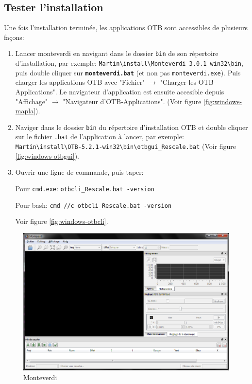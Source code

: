 \documentclass[10pt,a4paper]{article}
\begin{document}
\subsection{Tester l'installation}
Une fois l'installation terminée, les applications OTB sont accessibles de
plusieurs façons:
\begin{enumerate}

  \item Lancer monteverdi en navigant dans le dossier \texttt{bin} de son répertoire
d'installation, par exemple:
\texttt{Martin{\textbackslash}install{\textbackslash}Monteverdi-3.0.1-win32{\textbackslash}bin},
puis double cliquer sur \textbf{\texttt{monteverdi.bat}} (et non pas
\texttt{monteverdi.exe}).
Puis charger les applications OTB avec "Fichier" $\rightarrow$ "Charger les
OTB-Applications".
Le navigateur d'application est ensuite accesible depuis "Affichage"
$\rightarrow$ "Navigateur d'OTB-Applications".
(Voir figure \ref{fig:windows-mapla}).

  \item Naviger dans le dossier \texttt{bin} du répertoire d'installation OTB et double cliquer sur le
  fichier \texttt{.bat} de l'application à lancer, par exemple:\\
  \texttt{Martin{\textbackslash}install{\textbackslash}OTB-5.2.1-win32{\textbackslash}bin{\textbackslash}otbgui\_Rescale.bat}
  (Voir figure \ref{fig:windows-otbgui}).

  \item Ouvrir une ligne de commande, puis taper:

    Pour \texttt{cmd.exe}: \texttt{otbcli\_Rescale.bat -version}

    Pour bash: \texttt{cmd //c otbcli\_Rescale.bat -version}

    Voir figure \ref{fig:windows-otbcli}.

\end{enumerate}

\begin{figure}[h]
  \center
  \includegraphics[width=1\textwidth]{Art/windows-monteverdi.png}
  \caption[]{Monteverdi}
  \label{fig:windows-monteverdi}
\end{figure}
\end{document}

